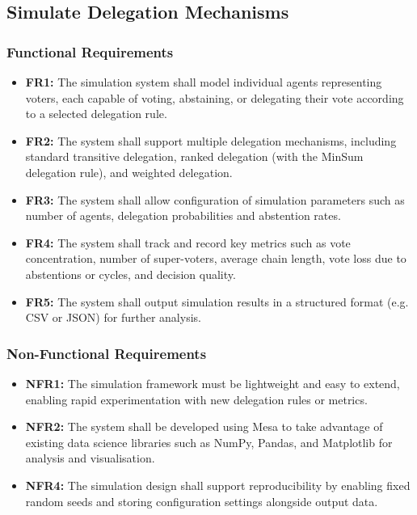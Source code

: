 \subsection{Simulate Delegation Mechanisms}
\subsubsection{Functional Requirements}
\begin{itemize}
    \item \textbf{FR1:} The simulation system shall model individual agents representing voters, each capable of voting, abstaining, or delegating their vote according to a selected delegation rule.

    \item \textbf{FR2:} The system shall support multiple delegation mechanisms, including standard transitive delegation, ranked delegation (with the MinSum delegation rule), and weighted delegation.

    \item \textbf{FR3:} The system shall allow configuration of simulation parameters such as number of agents, delegation probabilities and abstention rates.

    \item \textbf{FR4:} The system shall track and record key metrics such as vote concentration, number of super-voters, average chain length, vote loss due to abstentions or cycles, and decision quality.

    \item \textbf{FR5:} The system shall output simulation results in a structured format (e.g. CSV or JSON) for further analysis.
\end{itemize}

\subsubsection{Non-Functional Requirements}
\begin{itemize}
    \item \textbf{NFR1:} The simulation framework must be lightweight and easy to extend, enabling rapid experimentation with new delegation rules or metrics.

    \item \textbf{NFR2:} The system shall be developed using Mesa to take advantage of existing data science libraries such as NumPy, Pandas, and Matplotlib for analysis and visualisation.

    \item \textbf{NFR4:} The simulation design shall support reproducibility by enabling fixed random seeds and storing configuration settings alongside output data.

\end{itemize}

